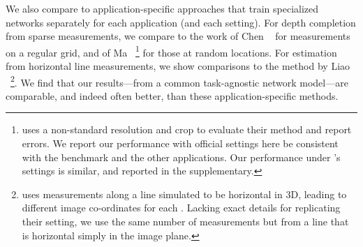 \documentclass[10pt,twocolumn,letterpaper]{article}
\begin{document}
We also compare to application-specific approaches that train specialized networks separately for each application (and each setting). For depth completion from sparse measurements, we compare to the work of Chen \etal~\cite{chen2018estimating} for measurements on a regular grid, and of Ma \etal~\cite{ma2018sparse}\footnote{\cite{ma2018sparse} uses a non-standard resolution and crop to evaluate their method and report errors. We report our performance with official settings here be consistent with the benchmark and the other applications. Our performance under \cite{ma2018sparse}'s settings is similar, and reported in the supplementary.}  for those at random locations. For estimation from horizontal line measurements, we show comparisons to the method by Liao \etal~\cite{liao2017sparse}\footnote{\cite{liao2017sparse} uses measurements along a line simulated to be horizontal in 3D, leading to different  image co-ordinates for each . Lacking exact details for replicating their setting, we use the same number of measurements but from a line that is horizontal simply in the image plane.}. We find that our results---from a common task-agnostic network model---are comparable, and indeed often better, than these application-specific methods.
\end{document}
